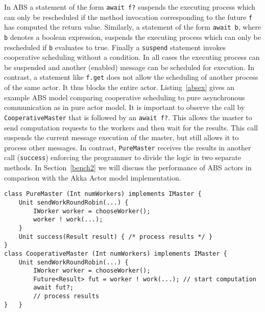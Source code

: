 In ABS a statement of the form \texttt{await f?}
suspends the executing process which can only be rescheduled if the method
invocation corresponding to the future \texttt{f} has computed the return value.
Similarly, a statement of the form \texttt{await b}, where \texttt{b} denotes a boolean expression, suspends the executing process which can only be rescheduled if \texttt{b} evaluates to true. Finally a \texttt{suspend} statement invokes cooperative scheduling without a condition. In all cases the executing process can be suspended and another (enabled) message can be scheduled for execution.
In contrast, a statement like \texttt{f.get} does not allow the scheduling of
another process of the same actor. It thus blocks the entire actor. 
Listing~\ref{absex} gives an example ABS model comparing cooperative scheduling to pure asynchronous communication as in pure actor model.
It is important to observe the call by \lstinline{CooperativeMaster} that is followed by an \texttt{await f?}. This allows the master to send computation requests to the workers and then wait for the results. This call suspends the current message execution of the master, but still allows it to process other messages. In contrast, \lstinline{PureMaster} receives the results in another call (\lstinline{success}) enforcing the programmer to divide the logic in two separate methods.
In Section~\ref{bench2} we will discuss the performance of ABS actors in comparison with the Akka Actor model implementation.


%
%

\begin{lstlisting}[caption=Cooperative scheduling vs. pure async approach, label=absex]
class PureMaster (Int numWorkers) implements IMaster {
	Unit sendWorkRoundRobin(...) {
		IWorker worker = chooseWorker();
		worker ! work(...);
	}
	Unit success(Result result) { /* process results */ }
}
class CooperativeMaster (Int numWorkers) implements IMaster {
	Unit sendWorkRoundRobin(...) {
		IWorker worker = chooseWorker();
		Future<Result> fut = worker ! work(...); // start computation
		await fut?;
		// process results
}	}
\end{lstlisting}


